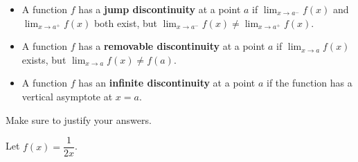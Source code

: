 \documentclass[addpoints,12pt]{exam}
\begin{document}
\begin{questions}
\begin{itemize}
\item A function $f$ has a {\bf jump discontinuity} at a point $a$ if $\displaystyle\lim_{x\to a^-}
f(x)$ and $\displaystyle\lim_{x \to a^+}f(x)$ both exist, but $\displaystyle\lim_{x \to a^-}f(x) \neq
\displaystyle\lim_{x \to a^+}f(x).$

\item A function $f$ has a {\bf removable discontinuity} at a point $a$ if $\displaystyle\lim_{x \to
a}f(x)$ exists, but $\displaystyle\lim_{x \to a}f(x) \neq f(a).$


\item A function $f$ has an {\bf infinite discontinuity} at a point $a$ if the function has a vertical
asymptote at $x=a.$


\end{itemize}

Make sure to justify your answers.


\newpage

\question Let $f(x) = \dfrac{1}{2x}$.




\end{questions}
\end{document}
